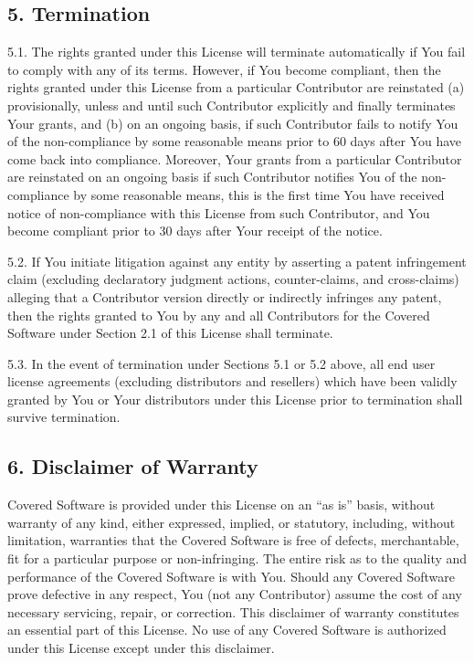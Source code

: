 \documentclass[letterpaper,10pt,openany,oneside,english]{sphinxmanual}
\begin{document}
\subsection{5. Termination}
\label{\detokenize{warranty:termination}}
5.1. The rights granted under this License will terminate automatically
if You fail to comply with any of its terms. However, if You become
compliant, then the rights granted under this License from a particular
Contributor are reinstated (a) provisionally, unless and until such
Contributor explicitly and finally terminates Your grants, and (b) on an
ongoing basis, if such Contributor fails to notify You of the
non-compliance by some reasonable means prior to 60 days after You have
come back into compliance. Moreover, Your grants from a particular
Contributor are reinstated on an ongoing basis if such Contributor
notifies You of the non-compliance by some reasonable means, this is the
first time You have received notice of non-compliance with this License
from such Contributor, and You become compliant prior to 30 days after
Your receipt of the notice.

5.2. If You initiate litigation against any entity by asserting a patent
infringement claim (excluding declaratory judgment actions,
counter-claims, and cross-claims) alleging that a Contributor version
directly or indirectly infringes any patent, then the rights granted to
You by any and all Contributors for the Covered Software under Section
2.1 of this License shall terminate.

5.3. In the event of termination under Sections 5.1 or 5.2 above, all
end user license agreements (excluding distributors and resellers) which
have been validly granted by You or Your distributors under this License
prior to termination shall survive termination.


\subsection{6. Disclaimer of Warranty}
\label{\detokenize{warranty:disclaimer-of-warranty}}
Covered Software is provided under this License on an “as is” basis, without warranty of any kind, either expressed, implied, or statutory, including, without limitation, warranties that the Covered Software is free of defects, merchantable, fit for a particular purpose or non-infringing. The entire risk as to the quality and performance of the Covered Software is with You. Should any Covered Software prove defective in any respect, You (not any Contributor) assume the cost of any necessary servicing, repair, or correction. This disclaimer of warranty constitutes an essential part of this License. No use of any Covered Software is authorized under this License except under this disclaimer.
\end{document}
